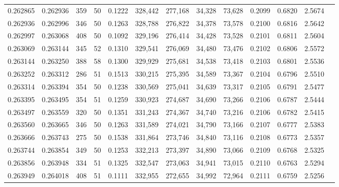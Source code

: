 \begin{tabular}{rrrrrrrrrrrrr}
0.262865 & 0.262936 &   359 &  50 &                                     0.1222 & 328,442 & 277,168 &  34,328 &  73,628 & 0.2099 & 0.6820 & 2.5674 \\
0.262936 & 0.262996 &   346 &  50 &                                     0.1263 & 328,788 & 276,822 &  34,378 &  73,578 & 0.2100 & 0.6816 & 2.5642 \\
0.262997 & 0.263068 &   408 &  50 &                                     0.1092 & 329,196 & 276,414 &  34,428 &  73,528 & 0.2101 & 0.6811 & 2.5604 \\
0.263069 & 0.263144 &   345 &  52 &                                     0.1310 & 329,541 & 276,069 &  34,480 &  73,476 & 0.2102 & 0.6806 & 2.5572 \\
0.263144 & 0.263250 &   388 &  58 &                                     0.1300 & 329,929 & 275,681 &  34,538 &  73,418 & 0.2103 & 0.6801 & 2.5536 \\
0.263252 & 0.263312 &   286 &  51 &                                     0.1513 & 330,215 & 275,395 &  34,589 &  73,367 & 0.2104 & 0.6796 & 2.5510 \\
0.263314 & 0.263394 &   354 &  50 &                                     0.1238 & 330,569 & 275,041 &  34,639 &  73,317 & 0.2105 & 0.6791 & 2.5477 \\
0.263395 & 0.263495 &   354 &  51 &                                     0.1259 & 330,923 & 274,687 &  34,690 &  73,266 & 0.2106 & 0.6787 & 2.5444 \\
0.263497 & 0.263559 &   320 &  50 &                                     0.1351 & 331,243 & 274,367 &  34,740 &  73,216 & 0.2106 & 0.6782 & 2.5415 \\
0.263560 & 0.263665 &   346 &  50 &                                     0.1263 & 331,589 & 274,021 &  34,790 &  73,166 & 0.2107 & 0.6777 & 2.5383 \\
0.263666 & 0.263743 &   275 &  50 &                                     0.1538 & 331,864 & 273,746 &  34,840 &  73,116 & 0.2108 & 0.6773 & 2.5357 \\
0.263744 & 0.263854 &   349 &  50 &                                     0.1253 & 332,213 & 273,397 &  34,890 &  73,066 & 0.2109 & 0.6768 & 2.5325 \\
0.263856 & 0.263948 &   334 &  51 &                                     0.1325 & 332,547 & 273,063 &  34,941 &  73,015 & 0.2110 & 0.6763 & 2.5294 \\
0.263949 & 0.264018 &   408 &  51 &                                     0.1111 & 332,955 & 272,655 &  34,992 &  72,964 & 0.2111 & 0.6759 & 2.5256 \\

\end{tabular}
